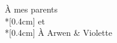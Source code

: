 \vspace*{2cm}

\begin{flushright}
	{ \Large \calligra À mes parents \\*[0.4cm] et \\*[0.4cm] À Arwen \& Violette }
\end{flushright}